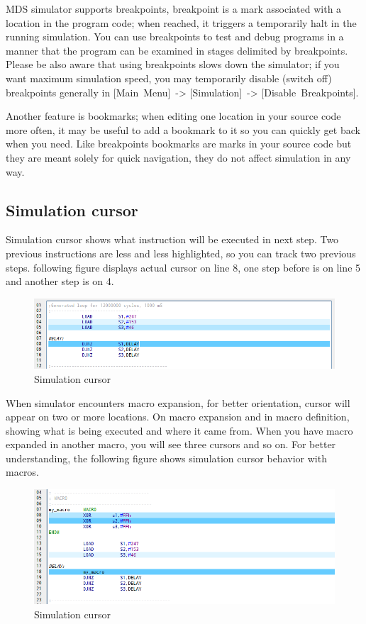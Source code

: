         MDS simulator supports breakpoints, breakpoint is a mark associated with a location in the program code; when reached, it triggers a temporarily halt in the running simulation. You can use breakpoints to test and debug programs in a manner that the program can be examined in stages delimited by breakpoints. Please be also aware that using breakpoints slows down the simulator; if you want maximum simulation speed, you may temporarily disable (switch off) breakpoints generally in [Main~Menu]~-> [Simulation]~-> [Disable~Breakpoints].

        Another feature is bookmarks; when editing one location in your source code more often, it may be useful to add a bookmark to it so you can quickly get back when you need. Like breakpoints bookmarks are marks in your source code but they are meant solely for quick navigation, they do not affect simulation in any way.

    \subsection{Simulation cursor}
        Simulation cursor shows what instruction will be executed in next step. Two previous instructions are less and less highlighted, so you can track two previous steps. following figure displays actual cursor on line 8, one step before is on line 5 and another step is on 4.
        \begin{figure}[h!]
            \centering
            \includegraphics[width=\textwidth]{img/simulationcursor1.png}
            \caption{Simulation cursor}
        \end{figure}

        When simulator encounters macro expansion, for better orientation, cursor will appear on two or more locations. On macro expansion and in macro definition, showing what is being executed and where it came from. When you have macro expanded in another macro, you will see three cursors and so on. For better understanding, the following figure shows simulation cursor behavior with macros.
        \begin{figure}[h!]
            \centering
            \includegraphics[width=\textwidth]{img/simulationcursor2.png}
            \caption{Simulation cursor}
        \end{figure}

